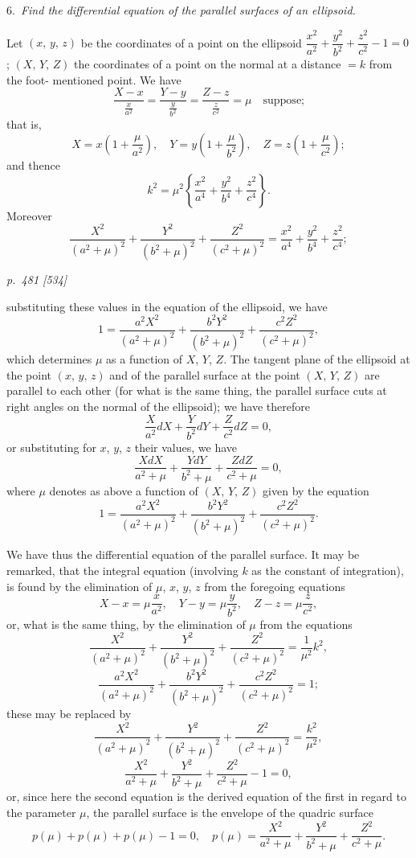 \documentclass[11pt,a4paper]{book}
\begin{document}
\smallskip
\noindent\textsc{6.}\, \textit{Find the differential equation of the parallel surfaces of an ellipsoid.}

Let $(x,\,y,\,z)$ be the coordinates of a point on the ellipsoid $\dfrac{x^2}{a^2} + \dfrac{y^2}{b^2} + \dfrac{z^2}{c^2} - 1 = 0$;
$(X,\,Y,\,Z)$ the coordinates of a point on the normal at a distance $= k$ from the foot-
mentioned point. We have
\[
\frac{X - x}{\frac{x}{a^2}} = \frac{Y - y}{\frac{y}{b^2}} = \frac{Z - z}{\frac{z}{c^2}} = \mu \quad \text{suppose;}
\]
that is,
\[
X = x\left(1 + \frac{\mu}{a^2}\right), \quad Y = y\left(1 + \frac{\mu}{b^2}\right), \quad Z = z\left(1 + \frac{\mu}{c^2}\right);
\]
and thence
\[
k^2 = \mu^2\left\{\frac{x^2}{a^4} + \frac{y^2}{b^4} + \frac{z^2}{c^4}\right\}.
\]
Moreover
\[
\frac{X^2}{(a^2 + \mu)^2} + \frac{Y^2}{(b^2 + \mu)^2} + \frac{Z^2}{(c^2 + \mu)^2} = \frac{x^2}{a^4} + \frac{y^2}{b^4} + \frac{z^2}{c^4};
\]

\clearpage

\bigskip
\textit{p.~481 [534]}
\smallskip

\noindent
substituting these values in the equation of the ellipsoid, we have
\[
1 = \frac{a^2 X^2}{(a^2 + \mu)^2} + \frac{b^2 Y^2}{(b^2 + \mu)^2} + \frac{c^2 Z^2}{(c^2 + \mu)^2},
\]
which determines $\mu$ as a function of $X$, $Y$, $Z$. The tangent plane of the ellipsoid at
the point $(x,\,y,\,z)$ and of the parallel surface at the point $(X,\,Y,\,Z)$ are parallel to
each other (for what is the same thing, the parallel surface cuts at right angles on the
normal of the ellipsoid); we have therefore
\[
\frac{X}{a^2}dX + \frac{Y}{b^2}dY + \frac{Z}{c^2}dZ = 0,
\]
or substituting for $x$, $y$, $z$ their values, we have
\[
\frac{X dX}{a^2 + \mu} + \frac{Y dY}{b^2 + \mu} + \frac{Z dZ}{c^2 + \mu} = 0,
\]
where $\mu$ denotes as above a function of $(X,\,Y,\,Z)$ given by the equation
\[
1 = \frac{a^2 X^2}{(a^2 + \mu)^2} + \frac{b^2 Y^2}{(b^2 + \mu)^2} + \frac{c^2 Z^2}{(c^2 + \mu)^2}.
\]

We have thus the differential equation of the parallel surface. It may be remarked,
that the integral equation (involving $k$ as the constant of integration), is found by
the elimination of $\mu$, $x$, $y$, $z$ from the foregoing equations
\[
X - x = \mu\frac{x}{a^2}, \quad Y - y = \mu\frac{y}{b^2}, \quad Z - z = \mu\frac{z}{c^2},
\]
or, what is the same thing, by the elimination of $\mu$ from the equations
\[
\frac{X^2}{(a^2 + \mu)^2} + \frac{Y^2}{(b^2 + \mu)^2} + \frac{Z^2}{(c^2 + \mu)^2} = \frac{1}{\mu^2}k^2,
\]
\[
\frac{a^2 X^2}{(a^2 + \mu)^2} + \frac{b^2 Y^2}{(b^2 + \mu)^2} + \frac{c^2 Z^2}{(c^2 + \mu)^2} = 1;
\]
these may be replaced by
\[
\frac{X^2}{(a^2 + \mu)^2} + \frac{Y^2}{(b^2 + \mu)^2} + \frac{Z^2}{(c^2 + \mu)^2} = \frac{k^2}{\mu^2},
\]
\[
\frac{X^2}{a^2 + \mu} + \frac{Y^2}{b^2 + \mu} + \frac{Z^2}{c^2 + \mu} - 1 = 0,
\]
or, since here the second equation is the derived equation of the first in regard to
the parameter $\mu$, the parallel surface is the envelope of the quadric surface
\[
p(\mu) + p(\mu) + p(\mu) - 1 = 0, \quad p(\mu) = \frac{X^2}{a^2 + \mu} + \frac{Y^2}{b^2 + \mu} + \frac{Z^2}{c^2 + \mu}.
\]
\end{document}
